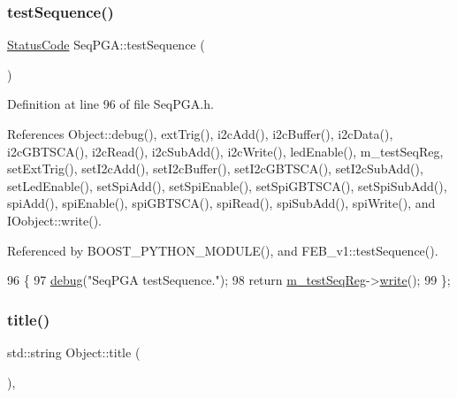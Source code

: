 \subsubsection{\texorpdfstring{test\+Sequence()}{testSequence()}}
{\footnotesize\ttfamily \hyperlink{classStatusCode}{Status\+Code} Seq\+P\+G\+A\+::test\+Sequence (\begin{DoxyParamCaption}{ }\end{DoxyParamCaption})\hspace{0.3cm}{\ttfamily [inline]}}



Definition at line 96 of file Seq\+P\+G\+A.\+h.



References Object\+::debug(), ext\+Trig(), i2c\+Add(), i2c\+Buffer(), i2c\+Data(), i2c\+G\+B\+T\+S\+C\+A(), i2c\+Read(), i2c\+Sub\+Add(), i2c\+Write(), led\+Enable(), m\+\_\+test\+Seq\+Reg, set\+Ext\+Trig(), set\+I2c\+Add(), set\+I2c\+Buffer(), set\+I2c\+G\+B\+T\+S\+C\+A(), set\+I2c\+Sub\+Add(), set\+Led\+Enable(), set\+Spi\+Add(), set\+Spi\+Enable(), set\+Spi\+G\+B\+T\+S\+C\+A(), set\+Spi\+Sub\+Add(), spi\+Add(), spi\+Enable(), spi\+G\+B\+T\+S\+C\+A(), spi\+Read(), spi\+Sub\+Add(), spi\+Write(), and I\+Oobject\+::write().



Referenced by B\+O\+O\+S\+T\+\_\+\+P\+Y\+T\+H\+O\+N\+\_\+\+M\+O\+D\+U\+L\+E(), and F\+E\+B\+\_\+v1\+::test\+Sequence().


\begin{DoxyCode}
96                             \{
97     \hyperlink{classObject_aac010553f022165573714b7014a15f0d}{debug}(\textcolor{stringliteral}{"SeqPGA testSequence."});
98     \textcolor{keywordflow}{return} \hyperlink{classSeqPGA_a7478537516c951a4d08f23b0789ed6d9}{m\_testSeqReg}->\hyperlink{classIOobject_a9f6984bc9f0fadcf800f1be2523ac744}{write}();
99   \};
\end{DoxyCode}
\mbox{\label{classObject_a73a0f1a41828fdd8303dd662446fb6c3}} 
\subsubsection{\texorpdfstring{title()}{title()}}
{\footnotesize\ttfamily std\+::string Object\+::title (\begin{DoxyParamCaption}{ }\end{DoxyParamCaption})\hspace{0.3cm}{\ttfamily [inline]}, {\ttfamily [inherited]}}



